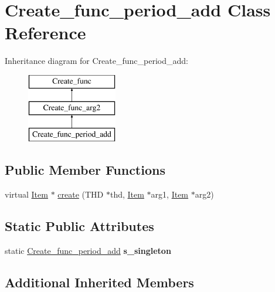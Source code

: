 \hypertarget{classCreate__func__period__add}{}\section{Create\+\_\+func\+\_\+period\+\_\+add Class Reference}
\label{classCreate__func__period__add}
Inheritance diagram for Create\+\_\+func\+\_\+period\+\_\+add\+:\begin{figure}[H]
\begin{center}
\leavevmode
\includegraphics[height=3.000000cm]{classCreate__func__period__add}
\end{center}
\end{figure}
\subsection*{Public Member Functions}
\begin{DoxyCompactItemize}
\item 
virtual \mbox{\hyperlink{classItem}{Item}} $\ast$ \mbox{\hyperlink{classCreate__func__period__add_ad3add92d533db3a3c518f52852903e70}{create}} (T\+HD $\ast$thd, \mbox{\hyperlink{classItem}{Item}} $\ast$arg1, \mbox{\hyperlink{classItem}{Item}} $\ast$arg2)
\end{DoxyCompactItemize}
\subsection*{Static Public Attributes}
\begin{DoxyCompactItemize}
\item 
\mbox{\label{classCreate__func__period__add_aa431797b6d2d6a2be5d72748aeb31d8e}} 
static \mbox{\hyperlink{classCreate__func__period__add}{Create\+\_\+func\+\_\+period\+\_\+add}} {\bfseries s\+\_\+singleton}
\end{DoxyCompactItemize}
\subsection*{Additional Inherited Members}


